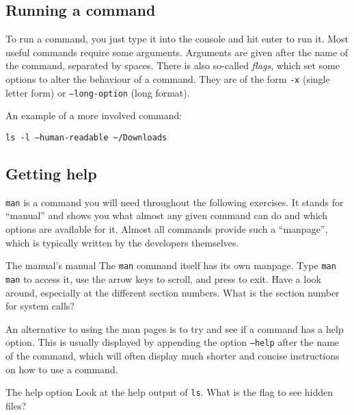 \documentclass{TheAlternativeCourse}
\begin{document}
\subsection{Running a command}

To run a command, you just type it into the console and hit enter to run it.
Most useful commands require some arguments. Arguments are given after the name of
the command, separated by spaces. There is also so-called \emph{flags}, which
set some options to alter the behaviour of a command. They are of the form
\texttt{-x} (single letter form) or \texttt{--long-option} (long format).

An example of a more involved command:

\begin{cmdbox}
\texttt{ls -l --human-readable \textasciitilde/Downloads}
\end{cmdbox}

\subsection{Getting help}

\texttt{man} is a command you will need throughout the following
exercises.  It stands for ``manual'' and shows you what almost any given
command can do and which options are available for it.  Almost all commands
provide such a ``manpage'', which is typically written by the developers
themselves.

\begin{exercisebox}{The manual's manual}
    The \texttt{man} command itself has its own manpage. Type \texttt{man man}
    to access it, use the arrow keys to scroll, and press  to exit.
    Have a look around, especially at the different section numbers.
    What is the section number for system calls?
\end{exercisebox}

An alternative to using the man pages is to try and see if a command has a help
option. This is usually displayed by appending the option \texttt{--help} after
the name of the command, which will often display much shorter and concise
instructions
on how to use a command.

\begin{exercisebox}{The help option}
    Look at the help output of \texttt{ls}. What is the flag to see hidden files?
\end{exercisebox}
\end{document}
